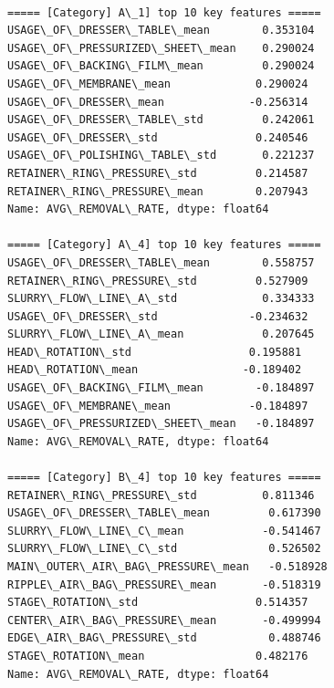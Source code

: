 \documentclass[11pt]{article}
\begin{document}
    \begin{Verbatim}[commandchars=\\\{\}]

===== [Category] A\_1] top 10 key features =====
USAGE\_OF\_DRESSER\_TABLE\_mean        0.353104
USAGE\_OF\_PRESSURIZED\_SHEET\_mean    0.290024
USAGE\_OF\_BACKING\_FILM\_mean         0.290024
USAGE\_OF\_MEMBRANE\_mean             0.290024
USAGE\_OF\_DRESSER\_mean             -0.256314
USAGE\_OF\_DRESSER\_TABLE\_std         0.242061
USAGE\_OF\_DRESSER\_std               0.240546
USAGE\_OF\_POLISHING\_TABLE\_std       0.221237
RETAINER\_RING\_PRESSURE\_std         0.214587
RETAINER\_RING\_PRESSURE\_mean        0.207943
Name: AVG\_REMOVAL\_RATE, dtype: float64

===== [Category] A\_4] top 10 key features =====
USAGE\_OF\_DRESSER\_TABLE\_mean        0.558757
RETAINER\_RING\_PRESSURE\_std         0.527909
SLURRY\_FLOW\_LINE\_A\_std             0.334333
USAGE\_OF\_DRESSER\_std              -0.234632
SLURRY\_FLOW\_LINE\_A\_mean            0.207645
HEAD\_ROTATION\_std                  0.195881
HEAD\_ROTATION\_mean                -0.189402
USAGE\_OF\_BACKING\_FILM\_mean        -0.184897
USAGE\_OF\_MEMBRANE\_mean            -0.184897
USAGE\_OF\_PRESSURIZED\_SHEET\_mean   -0.184897
Name: AVG\_REMOVAL\_RATE, dtype: float64

===== [Category] B\_4] top 10 key features =====
RETAINER\_RING\_PRESSURE\_std          0.811346
USAGE\_OF\_DRESSER\_TABLE\_mean         0.617390
SLURRY\_FLOW\_LINE\_C\_mean            -0.541467
SLURRY\_FLOW\_LINE\_C\_std              0.526502
MAIN\_OUTER\_AIR\_BAG\_PRESSURE\_mean   -0.518928
RIPPLE\_AIR\_BAG\_PRESSURE\_mean       -0.518319
STAGE\_ROTATION\_std                  0.514357
CENTER\_AIR\_BAG\_PRESSURE\_mean       -0.499994
EDGE\_AIR\_BAG\_PRESSURE\_std           0.488746
STAGE\_ROTATION\_mean                 0.482176
Name: AVG\_REMOVAL\_RATE, dtype: float64
    \end{Verbatim}
\end{document}
